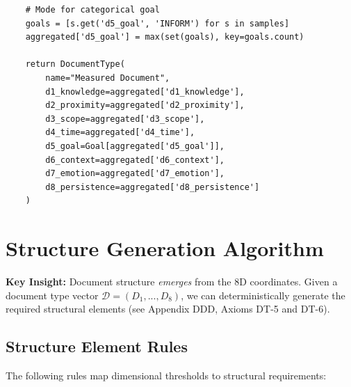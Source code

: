 \begin{verbatim}
    # Mode for categorical goal
    goals = [s.get('d5_goal', 'INFORM') for s in samples]
    aggregated['d5_goal'] = max(set(goals), key=goals.count)

    return DocumentType(
        name="Measured Document",
        d1_knowledge=aggregated['d1_knowledge'],
        d2_proximity=aggregated['d2_proximity'],
        d3_scope=aggregated['d3_scope'],
        d4_time=aggregated['d4_time'],
        d5_goal=Goal[aggregated['d5_goal']],
        d6_context=aggregated['d6_context'],
        d7_emotion=aggregated['d7_emotion'],
        d8_persistence=aggregated['d8_persistence']
    )
\end{verbatim}


\section{Structure Generation Algorithm}
\label{sec:doctype-structure}

\textbf{Key Insight:} Document structure \textit{emerges} from the 8D coordinates.
Given a document type vector $\mathcal{D} = (D_1, ..., D_8)$, we can deterministically
generate the required structural elements (see Appendix DDD, Axioms DT-5 and DT-6).

\subsection{Structure Element Rules}

The following rules map dimensional thresholds to structural requirements:

